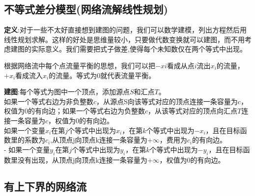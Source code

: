 \documentclass[12pt, a4paper, oneside]{ctexart}
\begin{document}
\subsection{不等式差分模型(网络流解线性规划)}
\textbf{定义}:对于一些不太好直接想到建图的问题，我们可以数学建模，列出方程然后用线性规划求解。这样的好处是思维量较小，只要做代数变换就可以建图，而不用考虑建图的实际意义。我们需要把式子做差,使得每个未知数仅在两个等式中出现。\par
根据网络流中每个点流量平衡的思想，我们可以把$−xi$看成从点$i$流出$x_{i}$的流量，$+x_{i}$看成流入$x_{i}$的流量。等式为$0$就代表流量平衡。\par
\textbf{建图}:每个等式为图中一个顶点，添加源点$S$和汇点$T$。\\
如果一个等式右边为非负整数$c$，从源点S向该等式对应的顶点连接一条容量为$c$，权值为$0$的有向边；如果一个等式右边为负整数$c$，从该等式对应的顶点向汇点$T$连接一条容量为$c$，权值为$0$的有向边。\\
如果一个变量$x_{i}$在第$j$个等式中出现为$x_{i}$，在第$k$个等式中出现为$-x_{i}$，且在目标函数里的系数为$c_{i}$,从顶点j向顶点k连接一条容量为$+\infty$，费用为$c_{i}$的有向边。\\
- 如果一个变量$y_{i}$在第$j$个等式中出现为$y_{i}$，在第$k$个等式中出现为$-y_{i}$，且在目标函数里没有出现，从顶点j向顶点k连接一条容量为$+\infty$，权值为$0$的有向边。


\subsection{有上下界的网络流}
\end{document}
